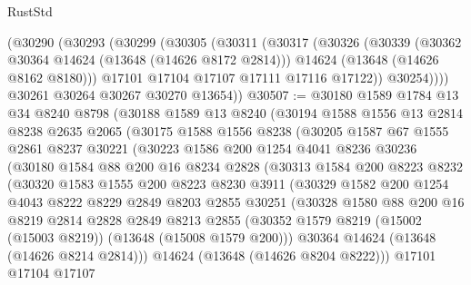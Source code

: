 \begin{lexlean}{RustStd}
\begin{coremodule}
      (@30290
        (@30293
          (@30299
            (@30305
              (@30311
                (@30317
                  (@30326
                    (@30339
                      (@30362 @30364 @14624 (@13648 (@14626 @8172 @2814)))
                      @14624
                      (@13648 (@14626 @8162 @8180)))
                    @17101
                    @17104
                    @17107
                    @17111
                    @17116
                    @17122))
                @30254))))
        @30261
        @30264
        @30267
        @30270
        @13654))
@30507 := @30180
    @1589
    @1784
    @13
    @34
    @8240
    @8798
    (@30188
      @1589
      @13
      @8240
      (@30194
        @1588
        @1556
        @13
        @2814
        @8238
        @2635
        @2065
        (@30175
          @1588
          @1556
          @8238
          (@30205
            @1587
            @67
            @1555
            @2861
            @8237
            @30221
            (@30223
              @1586
              @200
              @1254
              @4041
              @8236
              @30236
              (@30180
                @1584
                @88
                @200
                @16
                @8234
                @2828
                (@30313
                  @1584
                  @200
                  @8223
                  @8232
                  (@30320
                    @1583
                    @1555
                    @200
                    @8223
                    @8230
                    @3911
                    (@30329
                      @1582
                      @200
                      @1254
                      @4043
                      @8222
                      @8229
                      @2849
                      @8203
                      @2855
                      @30251
                      (@30328
                        @1580
                        @88
                        @200
                        @16
                        @8219
                        @2814
                        @2828
                        @2849
                        @8213
                        @2855
                        (@30352 @1579 @8219 (@15002 (@15003 @8219)) (@13648 (@15008 @1579 @200)))
                        @30364
                        @14624
                        (@13648 (@14626 @8214 @2814)))
                      @14624
                      (@13648 (@14626 @8204 @8222)))
                    @17101
                    @17104
                    @17107

\end{coremodule}
\end{lexlean}
